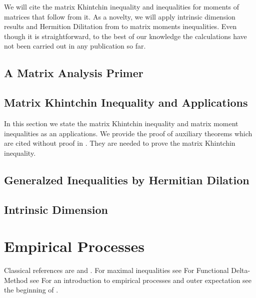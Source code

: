 \documentclass[11pt, a4paper, BCOR=10mm, DIV=11]{scrbook}
\theoremstyle{definition}
\theoremstyle{plain}
\begin{document}
  We will cite the matrix Khintchin inequality and 
  inequalities for moments of matrices that follow from it\cite{Chen2012}. 
  As a novelty, we will apply intrinsic dimension results and Hermition Dilitation from \cite{Tropp2015}  
  to matrix moments inequalities. Even though it is straightforward, to the best of our knowledge the calculations have not been carried out in any publication so far.
  \section{A Matrix Analysis Primer}
  
 \section{Matrix Khintchin Inequality and Applications}
 In this section we state the matrix Khintchin inequality and matrix moment inequalities as an applications.
 We provide the proof of auxiliary theorems which are cited without proof in \cite{Mackey2014}. They are needed to prove the matrix Khintchin inequality. 
  
  \section{Generalzed Inequalities by Hermitian Dilation}
  
  
  
  \newpage
  \section{Intrinsic Dimension}
  


\chapter{Empirical Processes}
Classical references are \cite{Vaart2000} and \cite{vaart2013}.
For maximal inequalities see \cite[§19]{Vaart2000}
For Functional Delta-Method see \cite[§20]{Vaart2000}
For an introduction to empirical processes and outer expectation 
see the beginning of \cite{vaart2013}.
%
\end{document}
